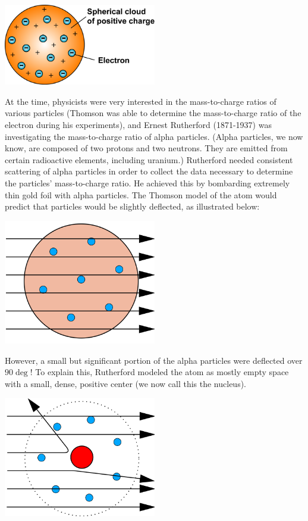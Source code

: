 \includegraphics[width=0.5\textwidth]{thomson_model.png}

At the time, physicists were very interested in the mass-to-charge ratios of 
various particles (Thomson was able to determine the mass-to-charge ratio of the 
electron during his experiments), and Ernest Rutherford (1871-1937) was 
investigating the mass-to-charge ratio of alpha particles. (Alpha particles, we 
now know, are composed of two protons and two neutrons. They are emitted from 
certain radioactive elements, including uranium.) Rutherford needed consistent 
scattering of alpha particles in order to collect the data necessary to determine 
the particles' mass-to-charge ratio. He achieved this by bombarding extremely 
thin gold foil with alpha particles. The Thomson model of the atom would predict 
that particles would be slightly deflected, as illustrated below: 

\includegraphics[width=0.5\textwidth]{thomson_gold.png}


However, a small but significant portion of the alpha particles were deflected 
over $90 \deg$! To explain this, Rutherford modeled the atom as mostly empty 
space with a small, dense, positive center (we now call this the nucleus).


\includegraphics[width=0.5\textwidth]{rutherford_gold.png}

